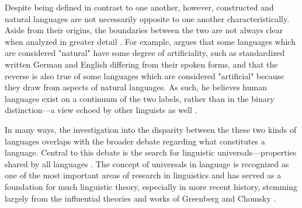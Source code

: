 \documentclass[12pt,a4paper]{article}
\numberwithin{figure}{section}
\numberwithin{table}{section}
\numberwithin{definition}{section}
\begin{document}

Despite being defined in contrast to one another, however, constructed and natural languages are not necessarily opposite to one another characteristically. Aside from their origins, the boundaries between the two are not always clear when analyzed in greater detail \parencite{goodall2022article}. For example, \textcite{Schubert1989inbook} argues that some languages which are considered "natural" have some degree of artificiality, such as standardized written German and English differing from their spoken forms, and that the reverse is also true of some languages which are considered "artificial" because they draw from aspects of natural languages. As such, he believes human languages exist on a continuum of the two labels, rather than in the binary distinction---a view echoed by other linguists as well \parencite{Novikov2022article}. 


In many ways, the investigation into the disparity between the these two kinds of languages overlaps with the broader debate regarding what constitutes a language. Central to this debate is the search for linguistic universals---properties shared by all languages \parencite{Mairal2006book}. The concept of universals in language is recognized as one of the most important areas of research in linguistics \parencite{Christiansen2009book} and has served as a foundation for much linguistic theory, especially in more recent history, stemming largely from the influential theories and works of Greenberg \parencite{Greenberg1970book} and Chomsky \parencite{Chomsky1957book,Cook2007book}. 
\end{document}
